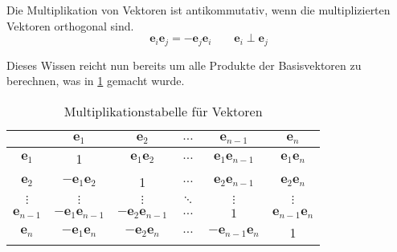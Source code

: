 \begin{satz}
    Die Multiplikation von Vektoren ist antikommutativ, wenn die multiplizierten Vektoren orthogonal sind.
    \begin{equation}
        \textbf{e}_i\textbf{e}_j = -\textbf{e}_j\textbf{e}_i \qquad \textbf{e}_i \perp \textbf{e}_j
    \end{equation}
\end{satz}
Dieses Wissen reicht nun bereits um alle Produkte der Basisvektoren zu berechnen, was in \ref{tab:multip_vec} gemacht wurde.
\begin{table}
\caption{Multiplikationstabelle für Vektoren}
\label{tab:multip_vec}
\begin{center}
\begin{tabular}{ |c|c|c|c|c|c| } 
 \hline
  & $\textbf{e}_1$ & $\textbf{e}_2$ & $\dots$ & $\textbf{e}_{n-1}$ & $\textbf{e}_{n}$ \\
  \hline
 $\textbf{e}_1$ & 1 & $\textbf{e}_1\textbf{e}_2$ & $\dots$ & $\textbf{e}_1\textbf{e}_{n-1}$ & $\textbf{e}_1\textbf{e}_{n}$ \\
 \hline
 $\textbf{e}_2$ & $-\textbf{e}_1\textbf{e}_2$ & 1 & $\dots$ & $\textbf{e}_2\textbf{e}_{n-1}$ & $\textbf{e}_2\textbf{e}_{n}$ \\
 \hline
 $\vdots$ & $\vdots$ & $\vdots$ & $\ddots$ & $\vdots$ & $\vdots$ \\
 \hline
 $\textbf{e}_{n-1}$ & $-\textbf{e}_1\textbf{e}_{n-1}$ & $-\textbf{e}_2\textbf{e}_{n-1}$  & $\dots$ & $1$ & $\textbf{e}_{n-1}\textbf{e}_{n}$ \\
 \hline
 $\textbf{e}_{n}$ & $-\textbf{e}_1\textbf{e}_{n}$ & $-\textbf{e}_2\textbf{e}_{n}$  & $\dots$ & $-\textbf{e}_{n-1}\textbf{e}_{n}$ & 1 \\
 \hline
\end{tabular}
\end{center}
\end{table}